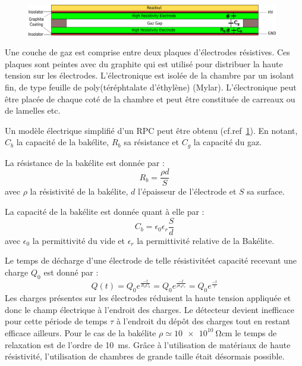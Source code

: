 \begin{figure}[th!]
	\centering
	\includegraphics[width=0.98\textwidth]{RPC/scheme_first.png}
	\label{RPCscheme}
\end{figure}
\vspace{-0.1cm}
Une couche de gaz est comprise entre deux plaques d'électrodes résistives. Ces plaques sont peintes avec du graphite qui est utilisé pour distribuer la haute tension sur les électrodes. L'électronique est isolée de la chambre par un isolant fin, de type feuille de poly(téréphtalate d'éthylène) (Mylar). L'électronique peut être placée de chaque coté de la chambre et peut être constituée de carreaux ou de lamelles etc.

Un modèle électrique simplifié d'un RPC peut être obtenu (cf.ref~\ref{RPCscheme}). En notant, $C_{b}$ la capacité de la bakélite, $R_{b}$ sa résistance et $C_{g}$ la capacité du gaz.

La résistance de la bakélite est donnée par :
\begin{equation}
R_b=\frac{\rho d}{S}
\end{equation}
avec $\rho$ la résistivité de la bakélite, $d$ l'épaisseur de l'électrode et $S$ sa surface.

La capacité de la bakélite est donnée quant à elle par :
\begin{equation}
C_{b}=\epsilon_0\epsilon_r\frac{S}{d}
\end{equation} 
avec $\epsilon_0$ la permittivité du vide et $\epsilon_r$ la permittivité relative de la Bakélite.

Le temps de décharge d'une électrode de telle résistivitéet capacité recevant une charge $Q_{0}$ est donné par :
\begin{equation}
Q(t)=Q_{0}e^{\frac{-t}{R_bC_b}}=Q_{0}e^{\frac{-t}{\rho\epsilon_{0}\epsilon_{r}}}=Q_{0}e^{\frac{-t}{\tau}}
\end{equation}
Les charges présentes sur les électrodes réduisent la haute tension appliquée et donc le champ électrique à l'endroit des charges. Le détecteur devient inefficace pour cette période de temps $\tau$ à l'endroit du dépôt des charges tout en restant efficace ailleurs. Pour le cas de la bakélite $\rho\simeq\SI{10e10}{\ohm\centi\meter}$ le temps de relaxation est de l'ordre de \SI{10}{\milli\second}. Grâce à l'utilisation de matériaux de haute résistivité, l'utilisation de chambres de grande taille était désormais possible.


